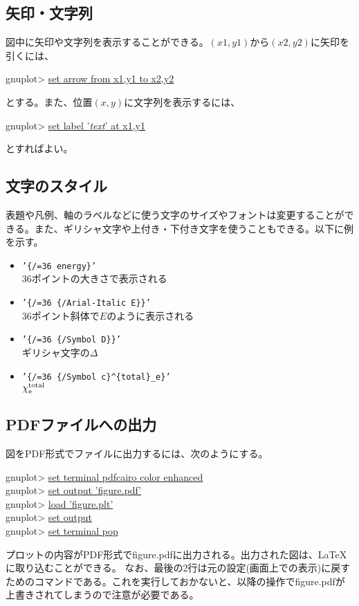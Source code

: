 \subsection{矢印・文字列}

図中に矢印や文字列を表示することができる。$(x1,y1)$から$(x2,y2)$に矢印を引くには、
\begin{commandline2}
gnuplot> \underline{set arrow from x1,y1 to x2,y2}
\end{commandline2} \noindent
とする。また、位置$(x,y)$に文字列を表示するには、
\begin{commandline2}
gnuplot> \underline{set label '{\it text}' at x1,y1}
\end{commandline2} \noindent
とすればよい。

\subsection{文字のスタイル}

表題や凡例、軸のラベルなどに使う文字のサイズやフォントは変更することができる。また、ギリシャ文字や上付き・下付き文字を使うこともできる。以下に例を示す。
\begin{itemize}
\item {\tt '\{/=36 energy\}'} \\
  36ポイントの大きさで表示される
\item {\tt '\{/=36 \{/Arial-Italic E\}\}'} \\
  36ポイント斜体で$E$のように表示される
\item {\tt '\{/=36 \{/Symbol D\}\}'} \\
  ギリシャ文字の$\Delta$
\item {\tt '\{/=36 \{/Symbol c\}\^{}\{total\}\_e\}'} \\
  $\chi^{\rm total}_{\rm e}$
\end{itemize}

\subsection{PDFファイルへの出力}

図をPDF形式でファイルに出力するには、次のようにする。
\begin{commandline2}
gnuplot> \underline{set terminal pdfcairo color enhanced} \\
gnuplot> \underline{set output 'figure.pdf'} \\
gnuplot> \underline{load 'figure.plt'} \\
gnuplot> \underline{set output} \\
gnuplot> \underline{set terminal pop}
\end{commandline2} \noindent
プロットの内容がPDF形式でfigure.pdfに出力される。出力された図は、\LaTeX に取り込むことができる。
なお、最後の2行は元の設定(画面上での表示)に戻すためのコマンドである。これを実行しておかないと、以降の操作でfigure.pdfが上書きされてしまうので注意が必要である。
